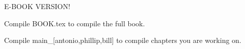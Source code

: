 \documentclass[7x9]{book}%
\begin{document}
E-BOOK VERSION!

Compile BOOK.tex to compile the full book.

Compile main\_[antonio,phillip,bill] to compile chapters you are working on.
\end{document}

